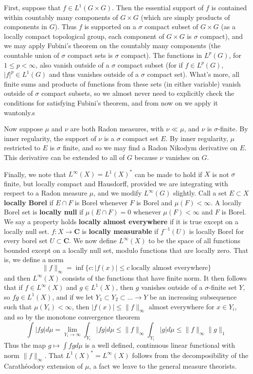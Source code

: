 First, suppose that $f \in L^1(G \times G)$. Then the essential support of $f$ is contained within countably many components of $G \times G$ (which are simply products of components in $G$). Thus $f$ is supported on a $\sigma$ compact subset of $G \times G$ (as a locally compact topological group, each component of $G \times G$ is $\sigma$ compact), and we may apply Fubini's theorem on the countably many components (the countable union of $\sigma$ compact sets is $\sigma$ compact). The functions in $L^p(G)$, for $1 \leq p < \infty$, also vanish outside of a $\sigma$ compact subset (for if $f \in L^p(G)$, $|f|^p \in L^1(G)$ and thus vanishes outside of a $\sigma$ compact set). What's more, all finite sums and products of functions from these sets (in either variable) vanish outside of $\sigma$ compact subsets, so we almost never need to explicitly check the conditions for satisfying Fubini's theorem, and from now on we apply it wantonly.s

Now suppose $\mu$ and $\nu$ are both Radon measures, with $\nu \ll \mu$, and $\nu$ is $\sigma$-finite. By inner regularity, the support of $\nu$ is a $\sigma$ compact set $E$. By inner regularity, $\mu$ restricted to $E$ is $\sigma$ finite, and so we may find a Radon Nikodym derivative on $E$. This derivative can be extended to all of $G$ because $\nu$ vanishes on $G$.

Finally, we note that $L^\infty(X) = L^1(X)^*$ can be made to hold if $X$ is not $\sigma$ finite, but locally compact and Hausdorff, provided we are integrating with respect to a Radon measure $\mu$, and we modify $L^\infty(G)$ slightly. Call a set $E \subset X$ {\bf locally Borel} if $E \cap F$ is Borel whenever $F$ is Borel and $\mu(F) < \infty$. A locally Borel set is {\bf locally null} if $\mu(E \cap F) = 0$ whenever $\mu(F) < \infty$ and $F$ is Borel. We say a property holds {\bf locally almost everywhere} if it is true except on a locally null set. $f: X \to \mathbf{C}$ is {\bf locally measurable} if $f^{-1}(U)$ is locally Borel for every borel set $U \subset \mathbf{C}$. We now define $L^\infty(X)$ to be the space of all functions bounded except on a locally null set, modulo functions that are locally zero. That is, we define a norm
%
\[ \| f \|_\infty = \inf \{ c : |f(x)| \leq c\ \text{locally almost everywhere} \} \]
%
and then $L^\infty(X)$ consists of the functions that have finite norm. It then follows that if $f \in L^\infty(X)$ and $g \in L^1(X)$, then $g$ vanishes outside of a $\sigma$-finite set $Y$, so $fg \in L^1(X)$, and if we let $Y_1 \subset Y_2 \subset \dots \to Y$ be an increasing subsequence such that $\mu(Y_i) < \infty$, then $|f(x)| \leq \| f \|_\infty$ almost everywhere for $x \in Y_i$, and so by the monotone convergence theorem
%
\[ \int |fg| d\mu = \lim_{Y_i \to \infty} \int_{Y_i} |fg| d\mu \leq \| f \|_\infty \int_{Y_i} |g| d\mu \leq \| f \|_\infty \| g \|_1 \]
%
Thus the map $g \mapsto \int fg d\mu$ is a well defined, continuous linear functional with norm $\| f \|_\infty$. That $L^1(X)^* = L^\infty(X)$ follows from the decomposibility of the Carath\'{e}odory extension of $\mu$, a fact we leave to the general measure theorists.

